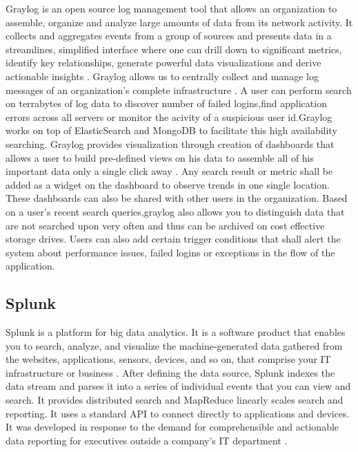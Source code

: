     Graylog is an open source log management tool that allows an
    organization to assemble, organize and analyze large amounts of
    data from its network activity. It collects and aggregates events
    from a group of sources and presents data in a streamlines,
    simplified interface where one can drill down to significant
    metrics, identify key relationships, generate powerful data
    visualizations and derive actionable insights
    \cite{www-graylog-blog}.  Graylog allows us to centrally collect
    and manage log messages of an organization's complete
    infrastructure \cite{www-graylog-optimization}. A user can
    perform search on terrabytes of log data to discover number of
    failed logins,find application errors across all servers or
    monitor the acivity of a suspicious user id.Graylog works on top
    of ElasticSearch and MongoDB to facilitate this high availability
    searching.  Graylog provides visualization through creation of
    dashboards that allows a user to build pre-defined views on his
    data to assemble all of his important data only a single click
    away \cite{www-graylog-dashboards}. Any search result or metric
    shall be added as a widget on the dashboard to observe trends in
    one single location. These dashboards can also be shared with
    other users in the organization. Based on a user's recent search
    queries,graylog also allows you to distinguish data that are not
    searched upon very often and thus can be archived on cost
    effective storage drives. Users can also add certain trigger
    conditions that shall alert the system about performance issues,
    failed logins or exceptions in the flow of the application.
    
\subsection{Splunk}

    Splunk is a platform for big data analytics. It is a software
    product that enables you to search, analyze, and visualize the
    machine-generated data gathered from the websites, applications,
    sensors, devices, and so on, that comprise your IT infrastructure
    or business \cite{www-splunk}. After defining the data source,
    Splunk indexes the data stream and parses it into a series of
    individual events that you can view and search. It provides
    distributed search and MapReduce linearly scales search and
    reporting. It uses a standard API to connect directly to
    applications and devices. It was developed in response to the
    demand for comprehensible and actionable data reporting for
    executives outside a company's IT department \cite{www-splunk}.
	  
